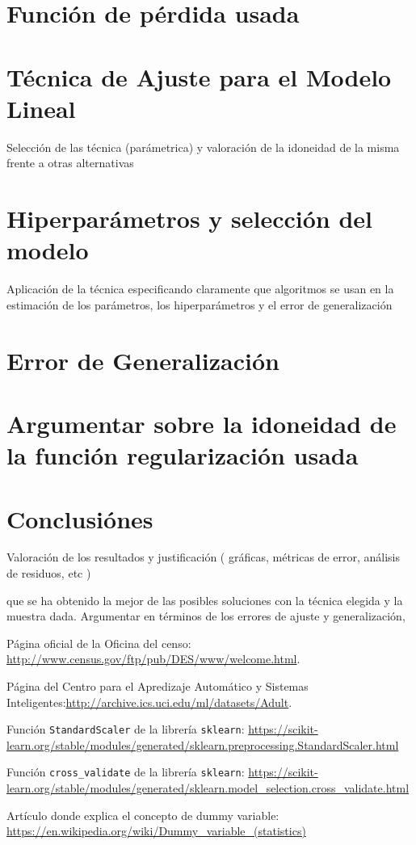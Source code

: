 \documentclass[11pt,a4paper]{article}
\begin{document}
\section{ Función de pérdida usada}
\section{ Técnica de Ajuste para el Modelo Lineal}
Selección de las técnica (parámetrica) y valoración de la idoneidad de la misma frente a otras alternativas
\section{Hiperparámetros y selección del modelo}
 Aplicación de la técnica especificando claramente que algoritmos se usan en la estimación de los parámetros, los hiperparámetros y el error de generalización

\section{ Error de Generalización}
\section{ Argumentar sobre la idoneidad de la función regularización usada }
\section{ Conclusiónes }
Valoración de los resultados y justificación
( gráficas, métricas de error, análisis de residuos, etc )


que se ha obtenido la mejor de las posibles soluciones con la técnica elegida y la muestra dada. Argumentar en términos de los errores de ajuste y generalización,


\newpage
\begin{thebibliography}{9}
Página oficial de la Oficina del censo: \url{http://www.census.gov/ftp/pub/DES/www/welcome.html}.

Página del Centro para el Apredizaje Automático y Sistemas Inteligentes:\url{http://archive.ics.uci.edu/ml/datasets/Adult}.

Función \texttt{StandardScaler} de la librería \texttt{sklearn}: \url{https://scikit-learn.org/stable/modules/generated/sklearn.preprocessing.StandardScaler.html}

Función \texttt{cross\_validate} de la librería \texttt{sklearn}:
\url{https://scikit-learn.org/stable/modules/generated/sklearn.model_selection.cross_validate.html}

Artículo donde explica el concepto de dummy variable: \url{https://en.wikipedia.org/wiki/Dummy_variable_(statistics)}
\end{thebibliography}
\end{document}
